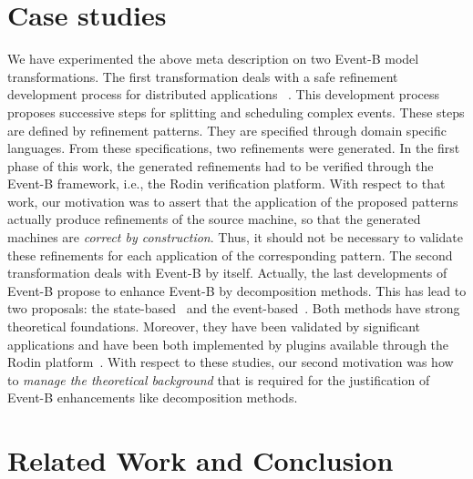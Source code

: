 \documentclass{llncs}
\begin{document}
\section{Case studies}

  We have experimented the above meta description on two Event-B model transformations.
The first transformation deals with a safe refinement development process
for distributed applications~\cite{[SBBF16]} . This development
process proposes successive steps for splitting and scheduling complex
events. These steps are
defined by refinement patterns. They are specified through domain
specific languages.  From these specifications, two refinements were
generated. In the first phase of this work, the generated refinements
had to be verified through the Event-B framework, i.e., the Rodin
verification platform. With respect to that work, our  motivation
was to assert that the application of the proposed patterns actually
produce refinements of the source machine, so that the generated
machines are \textit{correct by construction}. Thus, it should not be
necessary to validate these refinements for each application of the
corresponding pattern.
The second transformation deals with Event-B by itself. Actually, the last developments of
Event-B propose to enhance Event-B by decomposition methods. This has lead to two 
proposals: the state-based~\cite{[HA10]}  and the event-based~\cite{[SB10]}. 
Both methods have strong 
theoretical foundations. Moreover, they have been validated by significant applications and have
been both implemented by plugins available through the Rodin platform~\cite{[RCTB11]}. With respect to these
studies, our second motivation was how to \textit{manage the theoretical background} that is required
for the justification of Event-B enhancements like decomposition methods.


%        


%

%
\section{Related Work and Conclusion}
  
\end{document}
